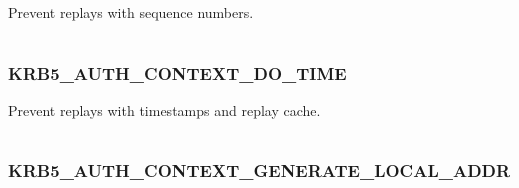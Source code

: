 \documentclass[letterpaper,10pt,english]{sphinxmanual}
\begin{document}
Prevent replays with sequence numbers.

\begin{tabulary}{\linewidth}{|L|L|}
\hline

 & 
\\\hline
\end{tabulary}



\subsubsection{KRB5\_AUTH\_CONTEXT\_DO\_TIME}
\label{appdev/refs/macros/KRB5_AUTH_CONTEXT_DO_TIME:krb5-auth-context-do-time-data}\label{appdev/refs/macros/KRB5_AUTH_CONTEXT_DO_TIME:krb5-auth-context-do-time}\label{appdev/refs/macros/KRB5_AUTH_CONTEXT_DO_TIME::doc}

\begin{fulllineitems}
\label{appdev/refs/macros/KRB5_AUTH_CONTEXT_DO_TIME:KRB5_AUTH_CONTEXT_DO_TIME}
\end{fulllineitems}


Prevent replays with timestamps and replay cache.

\begin{tabulary}{\linewidth}{|L|L|}
\hline

 & 
\\\hline
\end{tabulary}



\subsubsection{KRB5\_AUTH\_CONTEXT\_GENERATE\_LOCAL\_ADDR}
\label{appdev/refs/macros/KRB5_AUTH_CONTEXT_GENERATE_LOCAL_ADDR::doc}\label{appdev/refs/macros/KRB5_AUTH_CONTEXT_GENERATE_LOCAL_ADDR:krb5-auth-context-generate-local-addr}\label{appdev/refs/macros/KRB5_AUTH_CONTEXT_GENERATE_LOCAL_ADDR:krb5-auth-context-generate-local-addr-data}

\begin{fulllineitems}
\label{appdev/refs/macros/KRB5_AUTH_CONTEXT_GENERATE_LOCAL_ADDR:KRB5_AUTH_CONTEXT_GENERATE_LOCAL_ADDR}
\end{fulllineitems}
\end{document}
